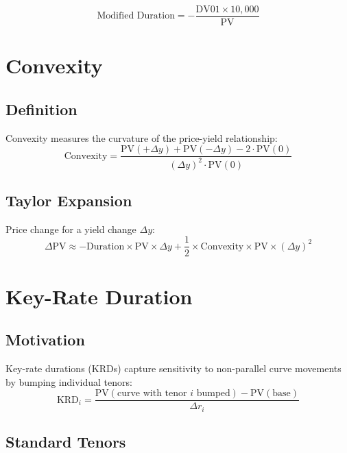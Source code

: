 \documentclass[12pt,a4paper]{report}
\newcommand{\pv}{\text{PV}}
\begin{document}
\begin{equation}
    \text{Modified Duration} = -\frac{\text{DV01} \times 10{,}000}{\pv}
\end{equation}

\section{Convexity}

\subsection{Definition}

Convexity measures the curvature of the price-yield relationship:
\begin{equation}
    \text{Convexity} = \frac{\pv(+\Delta y) + \pv(-\Delta y) - 2 \cdot \pv(0)}{(\Delta y)^2 \cdot \pv(0)}
\end{equation}

\subsection{Taylor Expansion}

Price change for a yield change $\Delta y$:
\begin{equation}
    \Delta \pv \approx -\text{Duration} \times \pv \times \Delta y + \frac{1}{2} \times \text{Convexity} \times \pv \times (\Delta y)^2
\end{equation}

\section{Key-Rate Duration}

\subsection{Motivation}

Key-rate durations (KRDs) capture sensitivity to non-parallel curve movements by bumping individual tenors:
\begin{equation}
    \text{KRD}_i = \frac{\pv(\text{curve with tenor } i \text{ bumped}) - \pv(\text{base})}{\Delta r_i}
\end{equation}

\subsection{Standard Tenors}
\end{document}
